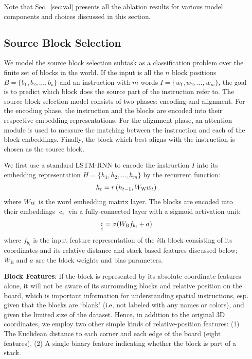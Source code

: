 \documentclass[letterpaper]{article} %
\DeclareMathOperator{\embb}{c}
\begin{document}
Note that Sec.~\ref{sec:val} presents all the ablation results for various model components and choices discussed in this section.

\subsection{Source Block Selection} \label{source}
We model the source block selection subtask as a classification problem over the finite set of blocks in the world.
If the input is all the $n$ block positions $B = \{b_1, b_2, \ldots, b_n\}$ and an instruction with $m$ words $I=\{w_1, w_2, \ldots, w_m\}$, the goal is to predict which block does the source part of the instruction refer to.
%
The source block selection model consists of two phases: encoding and alignment. For the encoding phase, the instruction and the blocks are encoded into their respective embedding representations. For the alignment phase, an attention module is used to measure the matching between the instruction and each of the block embeddings. Finally, the block which best aligns with the instruction is chosen as the source block.

We first use a standard LSTM-RNN to encode the instruction $I$ into its embedding representation $H = \{h_1, h_2, \ldots, h_m\}$ by the recurrent function:
\begin{equation}
h_t = r\left( h_{t-1}, W_{\textsc{W}} w_t \right)
\end{equation}
where $W_{\textsc{W}}$ is the word embedding matrix layer.
The blocks are encoded into their embeddings $\embb_i$ via a fully-connected layer with a sigmoid activation unit:
\begin{equation}
\embb_i = \sigma(W_\textsc{B} f_{b_i} + a)
%
\end{equation}
where $f_{b_i}$ is the input feature representation of the $i$th block consisting of its coordinates and its relative distance and stack based features discussed below; $W_\text{B}$ and $a$ are the block weights and bias parameters.

\textbf{Block Features}:
If the block is represented by its absolute coordinate features alone, it will not be aware of its surrounding blocks and relative position on the board, which is important information for understanding spatial instructions, esp. given that the blocks are `blank' (i.e, not labeled with any names or colors), and given the limited size of the dataset. Hence, in addition to the original 3D coordinates, we employ two other simple kinds of relative-position features: (1) The Euclidean distance to each corner and each edge of the board (eight features), (2) A single binary feature indicating whether the block is part of a stack.
\end{document}
